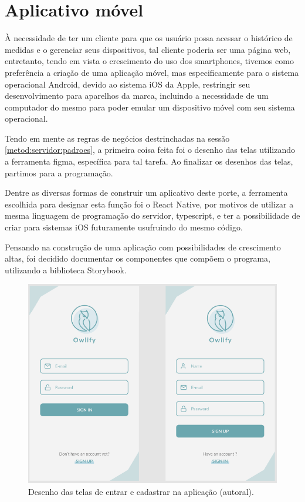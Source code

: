 \section{Aplicativo móvel}
\label{metod:app}
À necessidade de ter um cliente para que os usuário  possa acessar o histórico de medidas e o gerenciar seus dispositivos, tal cliente poderia ser uma página web, entretanto, tendo em vista o crescimento do uso dos smartphones, tivemos como preferência a criação de uma aplicação móvel, mas especificamente para o sistema operacional Android, devido ao sistema iOS da Apple, restringir seu desenvolvimento para aparelhos da marca, incluindo a necessidade de um computador do mesmo para poder emular um dispositivo móvel com seu sistema operacional.

Tendo em mente as regras de negócios destrinchadas na sessão \ref{metod:servidor:padroes}, a primeira coisa feita foi o desenho das telas utilizando a ferramenta figma, específica para tal tarefa. Ao finalizar os desenhos das telas, partimos para a programação.

Dentre as diversas formas de construir um aplicativo deste porte, a ferramenta escolhida para designar esta função foi o React Native, por motivos de utilizar a mesma linguagem de programação do servidor, typescript, e ter a possibilidade de criar para sistemas iOS futuramente usufruindo do mesmo código.

Pensando na construção de uma aplicação com possibilidades de crescimento altas, foi decidido documentar os componentes que compõem o programa, utilizando a biblioteca Storybook.

\begin{figure}[H]
  \centering
  \includegraphics[width=.80\textwidth]{assets/example-app-screens.png} 
  \caption{Desenho das telas de entrar e cadastrar na aplicação (autoral).}
  \label{fig:app-screns-login} 
\end{figure}